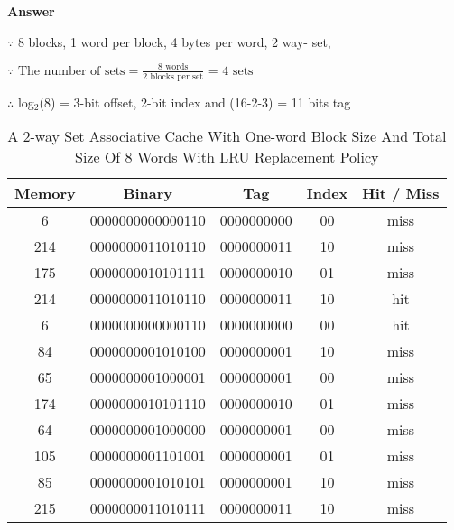 \documentclass[10pt]{extarticle}
\begin{document}
\begin{enumerate}
\begin{enumerate}
            \textbf{Answer}

            $\because$ 8 blocks, 1 word per block, 4 bytes per word, 2 way-
            set,

            $\because \text{ The number of sets} =
            \frac{\text{8 words}}{\text{2 blocks per set}} \text{ = 4 sets}$

            $\therefore$ log$_{2}$(8) = 3-bit offset, 2-bit index and (16-2-3)
            = 11 bits tag

            \begin{table}[h]
                \centering
                \caption{A 2-way Set Associative Cache With One-word Block Size
                And Total Size Of 8 Words With LRU Replacement Policy}
                \begin{tabular*}{300pt}{@{\extracolsep{\fill}} ccccc}
                    \textbf{Memory} & \textbf{Binary} & \textbf{Tag} &
                    \textbf{Index} & \textbf{Hit / Miss} \\
                    \hline
                    6   & 0000000000000110 & 0000000000 & 00 & miss  \\
                    214 & 0000000011010110 & 0000000011 & 10 & miss  \\
                    175 & 0000000010101111 & 0000000010 & 01 & miss  \\
                    214 & 0000000011010110 & 0000000011 & 10 & hit   \\
                    6   & 0000000000000110 & 0000000000 & 00 & hit   \\
                    84  & 0000000001010100 & 0000000001 & 10 & miss  \\
                    65  & 0000000001000001 & 0000000001 & 00 & miss  \\
                    174 & 0000000010101110 & 0000000010 & 01 & miss  \\
                    64  & 0000000001000000 & 0000000001 & 00 & miss  \\
                    105 & 0000000001101001 & 0000000001 & 01 & miss  \\
                    85  & 0000000001010101 & 0000000001 & 10 & miss  \\
                    215 & 0000000011010111 & 0000000011 & 10 & miss  \\
                \end{tabular*}
            \end{table}


\end{enumerate}
\end{enumerate}
\end{document}
